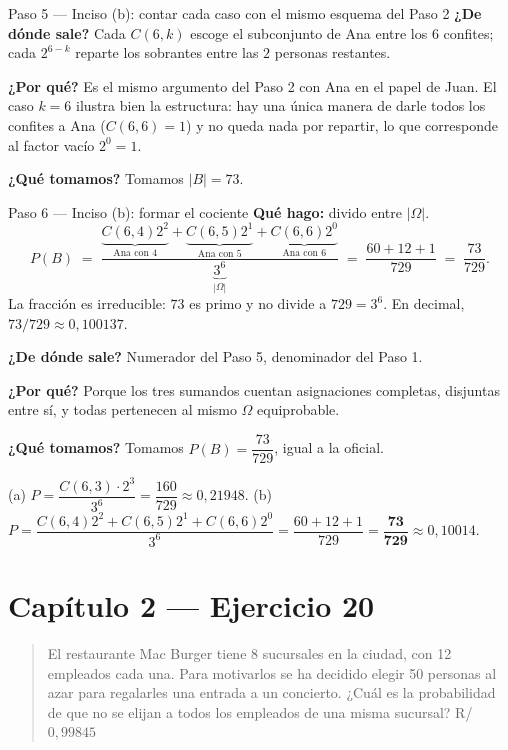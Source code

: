 \documentclass[11pt]{article}
\begin{document}
\begin{sol}
\begin{paso}{Paso 5 --- Inciso (b): contar cada caso con el mismo esquema del Paso 2}
\textbf{¿De d\'onde sale?} Cada $C(6,k)$ escoge el subconjunto de Ana entre los $6$ confites; cada $2^{6-k}$ reparte los sobrantes entre las $2$ personas restantes.

\textbf{¿Por qu\'e?} Es el mismo argumento del Paso 2 con Ana en el papel de Juan. El caso $k=6$ ilustra bien la estructura: hay una \'unica manera de darle todos los confites a Ana ($C(6,6)=1$) y no queda nada por repartir, lo que corresponde al factor vac\'io $2^{0}=1$.

\textbf{¿Qu\'e tomamos?} Tomamos $|B|=73$.
\end{paso}

\begin{paso}{Paso 6 --- Inciso (b): formar el cociente}
\textbf{Qu\'e hago:} divido entre $|\Omega|$.
\[
P(B)\;=\;\frac{\underbrace{C(6,4)2^{2}}_{\text{Ana con 4}}+\underbrace{C(6,5)2^{1}}_{\text{Ana con 5}}+\underbrace{C(6,6)2^{0}}_{\text{Ana con 6}}}{\underbrace{3^{6}}_{|\Omega|}}
\;=\;\frac{60+12+1}{729}\;=\;\frac{73}{729}.
\]
La fracci\'on es irreducible: $73$ es primo y no divide a $729=3^{6}$. En decimal, $73/729\approx 0{,}100137$.

\textbf{¿De d\'onde sale?} Numerador del Paso 5, denominador del Paso 1.

\textbf{¿Por qu\'e?} Porque los tres sumandos cuentan asignaciones completas, disjuntas entre s\'i, y todas pertenecen al mismo $\Omega$ equiprobable.

\textbf{¿Qu\'e tomamos?} Tomamos $P(B)=\dfrac{73}{729}$, igual a la oficial.
\end{paso}

\end{sol}

\begin{resp}
(a) $P=\dfrac{C(6,3)\cdot 2^{3}}{3^{6}}=\dfrac{160}{729}\approx 0{,}21948$. \qquad
(b) $P=\dfrac{C(6,4)2^{2}+C(6,5)2^{1}+C(6,6)2^{0}}{3^{6}}=\dfrac{60+12+1}{729}=\mathbf{\dfrac{73}{729}}\approx 0{,}10014$.
\end{resp}

\section*{Cap\'itulo 2 --- Ejercicio 20}

\begin{quote}
El restaurante Mac Burger tiene 8 sucursales en la ciudad, con 12 empleados cada una. Para motivarlos se ha decidido elegir 50 personas al azar para regalarles una entrada a un concierto. ¿Cu\'al es la probabilidad de que no se elijan a todos los empleados de una misma sucursal? \hfill R/ $0{,}99845$
\end{quote}
\end{document}
